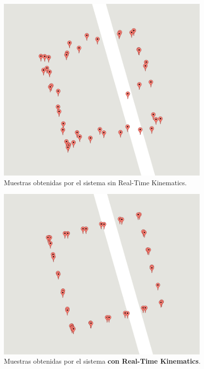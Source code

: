 \begin{figure}[H]
\centering
\includegraphics[width=0.95\textwidth]{Figures/NoRtkRes}
\caption[Muestras obtenidas sin Real-Time Kinematics.]{Muestras obtenidas por el sistema sin Real-Time Kinematics.}
\label{fig:NoRtkRes}
\end{figure}

\begin{figure}[H]
\centering
\includegraphics[width=0.95\textwidth]{Figures/RtkRes}
\caption[Muestras obtenidas por el sistema con Real-Time Kinematics.]{Muestras obtenidas por el sistema \textbf{con Real-Time Kinematics}.}
\label{fig:RtkRes}
\end{figure}

